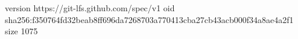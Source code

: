 version https://git-lfs.github.com/spec/v1
oid sha256:f350764fd32beab8ff696da7268703a770413cba27cb43acb000f34a8ae4a2f1
size 1075
